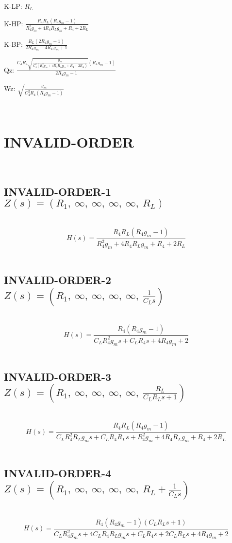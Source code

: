 \documentclass{article}
\begin{document}
K-LP: $R_{L}$\ 

K-HP: $\frac{R_{4} R_{L} \left(R_{4} g_{m} - 1\right)}{R_{4}^{2} g_{m} + 4 R_{4} R_{L} g_{m} + R_{4} + 2 R_{L}}$\ 

K-BP: $\frac{R_{L} \left(2 R_{4} g_{m} - 1\right)}{2 R_{4} g_{m} + 4 R_{L} g_{m} + 1}$\ 

Qz: $\frac{C_{4} R_{4} \sqrt{\frac{g_{m}}{C_{4}^{2} \left(R_{4}^{2} g_{m} + 4 R_{4} R_{L} g_{m} + R_{4} + 2 R_{L}\right)}} \left(R_{4} g_{m} - 1\right)}{2 R_{4} g_{m} - 1}$\ 

Wz: $\sqrt{\frac{g_{m}}{C_{4}^{2} R_{4} \left(R_{4} g_{m} - 1\right)}}$\ 

\ 

\section{INVALID-ORDER}\ 
\subsection{INVALID-ORDER-1 $Z(s) = \left( R_{1}, \  \infty, \  \infty, \  \infty, \  \infty, \  R_{L}\right)$ } \ 
\textbf{\[H(s) = \frac{R_{4} R_{L} \left(R_{4} g_{m} - 1\right)}{R_{4}^{2} g_{m} + 4 R_{4} R_{L} g_{m} + R_{4} + 2 R_{L}}\] } \ 
\subsection{INVALID-ORDER-2 $Z(s) = \left( R_{1}, \  \infty, \  \infty, \  \infty, \  \infty, \  \frac{1}{C_{L} s}\right)$ } \ 
\textbf{\[H(s) = \frac{R_{4} \left(R_{4} g_{m} - 1\right)}{C_{L} R_{4}^{2} g_{m} s + C_{L} R_{4} s + 4 R_{4} g_{m} + 2}\] } \ 
\subsection{INVALID-ORDER-3 $Z(s) = \left( R_{1}, \  \infty, \  \infty, \  \infty, \  \infty, \  \frac{R_{L}}{C_{L} R_{L} s + 1}\right)$ } \ 
\textbf{\[H(s) = \frac{R_{4} R_{L} \left(R_{4} g_{m} - 1\right)}{C_{L} R_{4}^{2} R_{L} g_{m} s + C_{L} R_{4} R_{L} s + R_{4}^{2} g_{m} + 4 R_{4} R_{L} g_{m} + R_{4} + 2 R_{L}}\] } \ 
\subsection{INVALID-ORDER-4 $Z(s) = \left( R_{1}, \  \infty, \  \infty, \  \infty, \  \infty, \  R_{L} + \frac{1}{C_{L} s}\right)$ } \ 
\textbf{\[H(s) = \frac{R_{4} \left(R_{4} g_{m} - 1\right) \left(C_{L} R_{L} s + 1\right)}{C_{L} R_{4}^{2} g_{m} s + 4 C_{L} R_{4} R_{L} g_{m} s + C_{L} R_{4} s + 2 C_{L} R_{L} s + 4 R_{4} g_{m} + 2}\] } \ 
\end{document}
